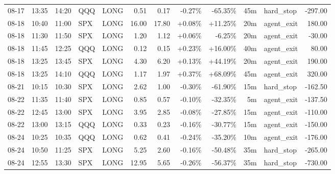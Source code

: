 \documentclass[11pt,a4paper]{article}
\begin{document}
\begin{center}
\begin{longtable}{>{\color{txtmain}}l l l l l r r r r r >{\color{txtmain}}l r}
08-17 & 13:35 & 14:20 & QQQ & LONG & 0.51 & 0.17 & \textcolor{lossred}{-0.27\%} & \textcolor{lossred}{-65.35\%} & 45m & hard\_stop & \textcolor{lossred}{-297.00} \\
08-18 & 10:40 & 11:00 & SPX & LONG & 16.00 & 17.80 & \textcolor{wingreen}{+0.08\%} & \textcolor{wingreen}{+11.25\%} & 20m & agent\_exit & \textcolor{wingreen}{180.00} \\
08-18 & 11:30 & 11:50 & SPX & LONG & 1.20 & 1.12 & \textcolor{wingreen}{+0.06\%} & \textcolor{lossred}{-6.25\%} & 20m & agent\_exit & \textcolor{lossred}{-30.00} \\
08-18 & 11:45 & 12:25 & QQQ & LONG & 0.12 & 0.15 & \textcolor{wingreen}{+0.23\%} & \textcolor{wingreen}{+16.00\%} & 40m & agent\_exit & \textcolor{wingreen}{80.00} \\
08-18 & 13:25 & 13:45 & SPX & LONG & 4.30 & 6.20 & \textcolor{wingreen}{+0.13\%} & \textcolor{wingreen}{+44.19\%} & 20m & agent\_exit & \textcolor{wingreen}{190.00} \\
08-18 & 13:25 & 14:10 & QQQ & LONG & 1.17 & 1.97 & \textcolor{wingreen}{+0.37\%} & \textcolor{wingreen}{+68.09\%} & 45m & agent\_exit & \textcolor{wingreen}{320.00} \\
08-21 & 10:15 & 10:30 & SPX & LONG & 2.62 & 1.00 & \textcolor{lossred}{-0.30\%} & \textcolor{lossred}{-61.90\%} & 15m & hard\_stop & \textcolor{lossred}{-162.50} \\
08-22 & 11:35 & 11:40 & SPX & LONG & 0.85 & 0.57 & \textcolor{lossred}{-0.10\%} & \textcolor{lossred}{-32.35\%} & 5m & agent\_exit & \textcolor{lossred}{-137.50} \\
08-22 & 12:45 & 13:00 & SPX & LONG & 3.95 & 2.85 & \textcolor{lossred}{-0.08\%} & \textcolor{lossred}{-27.85\%} & 15m & agent\_exit & \textcolor{lossred}{-110.00} \\
08-22 & 13:00 & 13:15 & QQQ & LONG & 0.33 & 0.23 & \textcolor{lossred}{-0.16\%} & \textcolor{lossred}{-30.77\%} & 15m & agent\_exit & \textcolor{lossred}{-150.00} \\
08-24 & 10:25 & 10:35 & QQQ & LONG & 0.62 & 0.41 & \textcolor{lossred}{-0.24\%} & \textcolor{lossred}{-35.20\%} & 10m & agent\_exit & \textcolor{lossred}{-176.00} \\
08-24 & 10:50 & 11:25 & SPX & LONG & 5.25 & 2.60 & \textcolor{lossred}{-0.16\%} & \textcolor{lossred}{-50.48\%} & 35m & hard\_stop & \textcolor{lossred}{-265.00} \\
08-24 & 12:55 & 13:30 & SPX & LONG & 12.95 & 5.65 & \textcolor{lossred}{-0.26\%} & \textcolor{lossred}{-56.37\%} & 35m & hard\_stop & \textcolor{lossred}{-730.00} \\

\end{longtable}
\end{center}
\end{document}
